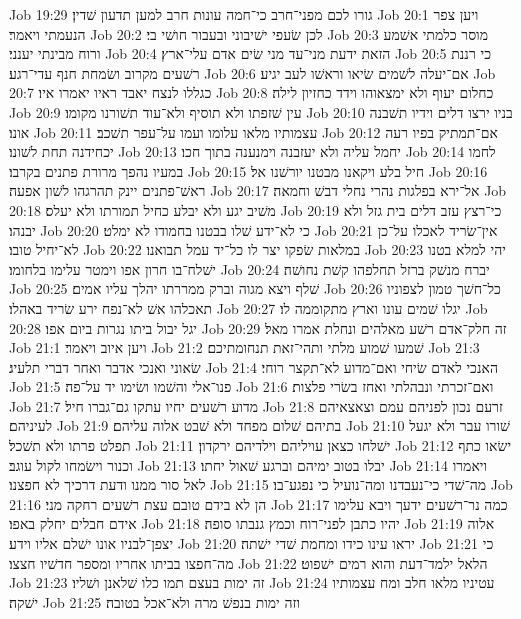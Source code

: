 Job 19:29  גורו לכם מפני־חרב כי־חמה עונות חרב למען תדעון שׁדין׃
Job 20:1  ויען צפר הנעמתי ויאמר׃
Job 20:2  לכן שׂעפי ישׁיבוני ובעבור חושׁי בי׃
Job 20:3  מוסר כלמתי אשׁמע ורוח מבינתי יענני׃
Job 20:4  הזאת ידעת מני־עד מני שׂים אדם עלי־ארץ׃
Job 20:5  כי רננת רשׁעים מקרוב ושׂמחת חנף עדי־רגע׃
Job 20:6  אם־יעלה לשׁמים שׂיאו וראשׁו לעב יגיע׃
Job 20:7  כגללו לנצח יאבד ראיו יאמרו איו׃
Job 20:8  כחלום יעוף ולא ימצאוהו וידד כחזיון לילה׃
Job 20:9  עין שׁזפתו ולא תוסיף ולא־עוד תשׁורנו מקומו׃
Job 20:10  בניו ירצו דלים וידיו תשׁבנה אונו׃
Job 20:11  עצמותיו מלאו עלומו ועמו על־עפר תשׁכב׃
Job 20:12  אם־תמתיק בפיו רעה יכחידנה תחת לשׁונו׃
Job 20:13  יחמל עליה ולא יעזבנה וימנענה בתוך חכו׃
Job 20:14  לחמו במעיו נהפך מרורת פתנים בקרבו׃
Job 20:15  חיל בלע ויקאנו מבטנו יורשׁנו אל׃
Job 20:16  ראשׁ־פתנים יינק תהרגהו לשׁון אפעה׃
Job 20:17  אל־ירא בפלגות נהרי נחלי דבשׁ וחמאה׃
Job 20:18  משׁיב יגע ולא יבלע כחיל תמורתו ולא יעלס׃
Job 20:19  כי־רצץ עזב דלים בית גזל ולא יבנהו׃
Job 20:20  כי לא־ידע שׁלו בבטנו בחמודו לא ימלט׃
Job 20:21  אין־שׂריד לאכלו על־כן לא־יחיל טובו׃
Job 20:22  במלאות שׂפקו יצר לו כל־יד עמל תבואנו׃
Job 20:23  יהי למלא בטנו ישׁלח־בו חרון אפו וימטר עלימו בלחומו׃
Job 20:24  יברח מנשׁק ברזל תחלפהו קשׁת נחושׁה׃
Job 20:25  שׁלף ויצא מגוה וברק ממררתו יהלך עליו אמים׃
Job 20:26  כל־חשׁך טמון לצפוניו תאכלהו אשׁ לא־נפח ירע שׂריד באהלו׃
Job 20:27  יגלו שׁמים עונו וארץ מתקוממה לו׃
Job 20:28  יגל יבול ביתו נגרות ביום אפו׃
Job 20:29  זה חלק־אדם רשׁע מאלהים ונחלת אמרו מאל׃
Job 21:1  ויען איוב ויאמר׃
Job 21:2  שׁמעו שׁמוע מלתי ותהי־זאת תנחומתיכם׃
Job 21:3  שׂאוני ואנכי אדבר ואחר דברי תלעיג׃
Job 21:4  האנכי לאדם שׂיחי ואם־מדוע לא־תקצר רוחי׃
Job 21:5  פנו־אלי והשׁמו ושׂימו יד על־פה׃
Job 21:6  ואם־זכרתי ונבהלתי ואחז בשׂרי פלצות׃
Job 21:7  מדוע רשׁעים יחיו עתקו גם־גברו חיל׃
Job 21:8  זרעם נכון לפניהם עמם וצאצאיהם לעיניהם׃
Job 21:9  בתיהם שׁלום מפחד ולא שׁבט אלוה עליהם׃
Job 21:10  שׁורו עבר ולא יגעל תפלט פרתו ולא תשׁכל׃
Job 21:11  ישׁלחו כצאן עויליהם וילדיהם ירקדון׃
Job 21:12  ישׂאו כתף וכנור וישׂמחו לקול עוגב׃
Job 21:13  יבלו בטוב ימיהם וברגע שׁאול יחתו׃
Job 21:14  ויאמרו לאל סור ממנו ודעת דרכיך לא חפצנו׃
Job 21:15  מה־שׁדי כי־נעבדנו ומה־נועיל כי נפגע־בו׃
Job 21:16  הן לא בידם טובם עצת רשׁעים רחקה מני׃
Job 21:17  כמה נר־רשׁעים ידעך ויבא עלימו אידם חבלים יחלק באפו׃
Job 21:18  יהיו כתבן לפני־רוח וכמץ גנבתו סופה׃
Job 21:19  אלוה יצפן־לבניו אונו ישׁלם אליו וידע׃
Job 21:20  יראו עינו כידו ומחמת שׁדי ישׁתה׃
Job 21:21  כי מה־חפצו בביתו אחריו ומספר חדשׁיו חצצו׃
Job 21:22  הלאל ילמד־דעת והוא רמים ישׁפוט׃
Job 21:23  זה ימות בעצם תמו כלו שׁלאנן ושׁליו׃
Job 21:24  עטיניו מלאו חלב ומח עצמותיו ישׁקה׃
Job 21:25  וזה ימות בנפשׁ מרה ולא־אכל בטובה׃
